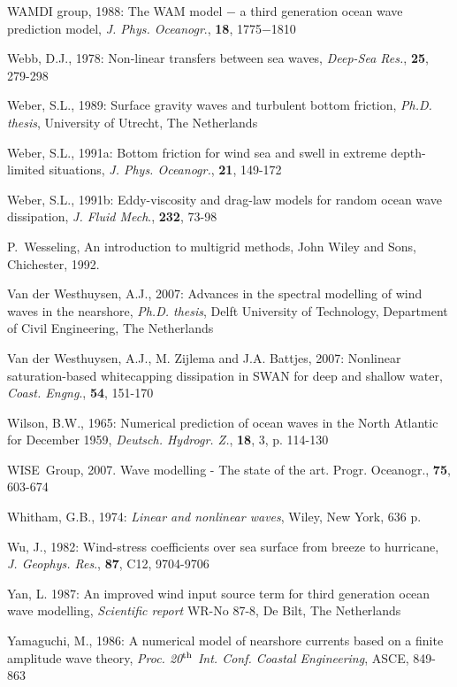 \documentclass[12pt]{book}
\begin{document}
\begin{thebibliography}{10}
WAMDI group, 1988: The WAM model $-$ a third generation ocean wave prediction model, {\it J. Phys.
Oceanogr}., {\bf 18}, 1775$-$1810

Webb, D.J., 1978: Non-linear transfers between sea waves, {\it Deep-Sea Res.}, {\bf 25}, 279-298

Weber, S.L., 1989: Surface gravity waves and turbulent bottom friction, {\it Ph.D. thesis}, University of Utrecht,
The Netherlands

Weber, S.L., 1991a: Bottom friction for wind sea and swell in extreme depth-limited situations, {\it J. Phys.
Oceanogr.}, {\bf 21}, 149-172

Weber, S.L., 1991b: Eddy-viscosity and drag-law models for random ocean wave dissipation, {\it J. Fluid
Mech}., {\bf 232}, 73-98

P.~Wesseling, An introduction to multigrid methods, John Wiley and Sons,
  Chichester, 1992.

Van der Westhuysen, A.J., 2007: Advances in the spectral modelling of wind waves in the nearshore, {\it Ph.D. thesis},
Delft University of Technology, Department of Civil Engineering, The Netherlands

Van der Westhuysen, A.J., M. Zijlema and J.A. Battjes, 2007: Nonlinear saturation-based whitecapping dissipation
in SWAN for deep and shallow water, {\it Coast. Engng}., {\bf 54}, 151-170

Wilson, B.W., 1965: Numerical prediction of ocean waves in the North Atlantic for December 1959,
{\it Deutsch. Hydrogr. Z.}, {\bf 18}, 3, p. 114-130

WISE~Group, 2007. Wave modelling - The state of the art. Progr. Oceanogr., {\bf 75}, 603-674

Whitham, G.B., 1974: {\it Linear and nonlinear waves}, Wiley, New York, 636 p.

Wu, J., 1982: Wind-stress coefficients over sea surface from breeze to hurricane, {\it J. Geophys. Res}., {\bf 87},
C12, 9704-9706

Yan, L. 1987: An improved wind input source term for third generation ocean wave modelling, {\it Scientific
report} WR-No 87-8, De Bilt, The Netherlands

Yamaguchi, M., 1986: A numerical model of nearshore currents based on a finite amplitude wave theory,
{\it Proc. 20$^{{\rm th}}$ Int. Conf. Coastal Engineering}, ASCE, 849-863


\end{thebibliography}
\end{document}
